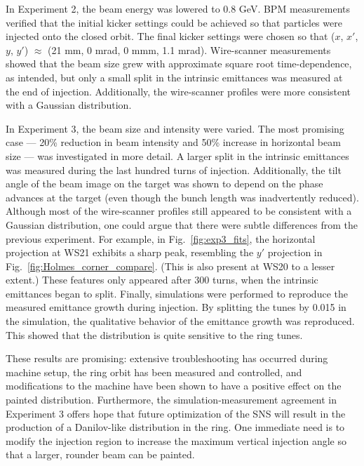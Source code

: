 In Experiment 2, the beam energy was lowered to 0.8 GeV. BPM measurements verified that the initial kicker settings could be achieved so that particles were injected onto the closed orbit. The final kicker settings were chosen so that ($x$, $x'$, $y$, $y'$) $\approx$ (21 mm, 0 mrad, 0 mmm, 1.1 mrad). Wire-scanner measurements showed that the beam size grew with approximate square root time-dependence, as intended, but only a small split in the intrinsic emittances was measured at the end of injection. Additionally, the wire-scanner profiles were more consistent with a Gaussian distribution.

In Experiment 3, the beam size and intensity were varied. The most promising case — 20\% reduction in beam intensity and 50\% increase in horizontal beam size — was investigated in more detail. A larger split in the intrinsic emittances was measured during the last hundred turns of injection. Additionally, the tilt angle of the beam image on the target was shown to depend on the phase advances at the target (even though the bunch length was inadvertently reduced). Although most of the wire-scanner profiles still appeared to be consistent with a Gaussian distribution, one could argue that there were subtle differences from the previous experiment. For example, in Fig.~\ref{fig:exp3_fits}, the horizontal projection at WS21 exhibits a sharp peak, resembling the $y'$ projection in Fig.~\ref{fig:Holmes_corner_compare}. (This is also present at WS20 to a lesser extent.) These features only appeared after 300 turns, when the intrinsic emittances began to split. Finally, simulations were performed to reproduce the measured emittance growth during injection. By splitting the tunes by 0.015 in the simulation, the qualitative behavior of the emittance growth was reproduced. This showed that the distribution is quite sensitive to the ring tunes.

These results are promising: extensive troubleshooting has occurred during machine setup, the ring orbit has been measured and controlled, and modifications to the machine have been shown to have a positive effect on the painted distribution. Furthermore, the simulation-measurement agreement in Experiment 3 offers hope that future optimization of the SNS will result in the production of a Danilov-like distribution in the ring. One immediate need is to modify the injection region to increase the maximum vertical injection angle so that a larger, rounder beam can be painted.